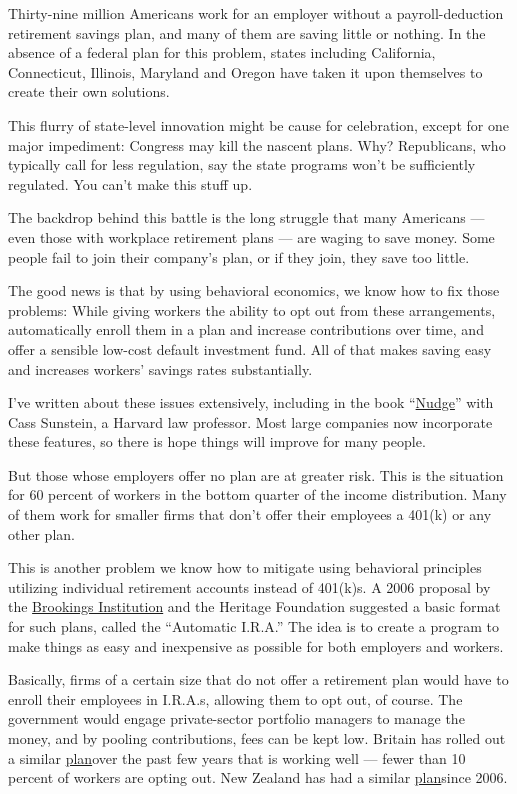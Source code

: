 Thirty-nine million Americans work for an employer without a
payroll-deduction retirement savings plan, and many of them are saving
little or nothing. In the absence of a federal plan for this problem,
states including California, Connecticut, Illinois, Maryland and Oregon
have taken it upon themselves to create their own solutions.

This flurry of state-level innovation might be cause for celebration,
except for one major impediment: Congress may kill the nascent plans.
Why? Republicans, who typically call for less regulation, say the state
programs won't be sufficiently regulated. You can't make this stuff up.

The backdrop behind this battle is the long struggle that many Americans
--- even those with workplace retirement plans --- are waging to save
money. Some people fail to join their company's plan, or if they join,
they save too little.

The good news is that by using behavioral economics, we know how to fix
those problems: While giving workers the ability to opt out from these
arrangements, automatically enroll them in a plan and increase
contributions over time, and offer a sensible low-cost default
investment fund. All of that makes saving easy and increases workers'
savings rates substantially.

I've written about these issues extensively, including in the book
``\href{http://www.nytimes3xbfgragh.onion/2008/08/24/books/review/Friedman-t.html}{Nudge}''
with Cass Sunstein, a Harvard law professor. Most large companies now
incorporate these features, so there is hope things will improve for
many people.

But those whose employers offer no plan are at greater risk. This is the
situation for 60 percent of workers in the bottom quarter of the income
distribution. Many of them work for smaller firms that don't offer their
employees a 401(k) or any other plan.

This is another problem we know how to mitigate using behavioral
principles utilizing individual retirement accounts instead of 401(k)s.
A 2006 proposal by the
\href{https://www.brookings.edu/wp-content/uploads/2016/06/07_automatic_ira_iwry.pdf}{Brookings
Institution} and the Heritage Foundation suggested a basic format for
such plans, called the ``Automatic I.R.A.'' The idea is to create a
program to make things as easy and inexpensive as possible for both
employers and workers.

Basically, firms of a certain size that do not offer a retirement plan
would have to enroll their employees in I.R.A.s, allowing them to opt
out, of course. The government would engage private-sector portfolio
managers to manage the money, and by pooling contributions, fees can be
kept low. Britain has rolled out a similar
\href{https://www.nestpensions.org.uk/schemeweb/NestWeb/includes/public/docs/nest-insight-2015,pdf.pdf}{plan}over
the past few years that is working well --- fewer than 10 percent of
workers are opting out. New Zealand has had a similar
\href{http://www.kiwisaver.govt.nz/new/about/summary/}{plan}since 2006.

